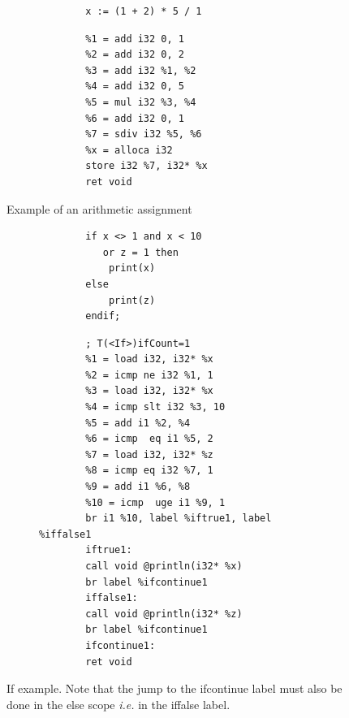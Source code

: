 \documentclass[letterpaper]{article}
\begin{document}
\begin{figure}[H]
    \begin{subfigure}{.5\textwidth}
        \begin{lstlisting}
        x := (1 + 2) * 5 / 1
        \end{lstlisting}
    \end{subfigure}
    \begin{subfigure}{.5\textwidth}
        \begin{lstlisting}
        %1 = add i32 0, 1
    	%2 = add i32 0, 2
    	%3 = add i32 %1, %2
    	%4 = add i32 0, 5
    	%5 = mul i32 %3, %4
    	%6 = add i32 0, 1
    	%7 = sdiv i32 %5, %6
    	%x = alloca i32
    	store i32 %7, i32* %x
    	ret void
        \end{lstlisting}
    \end{subfigure}
    \caption{Example of an arithmetic assignment}
\end{figure}


\begin{figure}[H]
    \begin{subfigure}{.5\textwidth}
        \begin{lstlisting}
        if x <> 1 and x < 10
           or z = 1 then
            print(x)
        else
            print(z)
        endif;
        \end{lstlisting}
    \end{subfigure}
    \begin{subfigure}{.5\textwidth}
        \begin{lstlisting}
        ; T(<If>)ifCount=1
    	%1 = load i32, i32* %x
    	%2 = icmp ne i32 %1, 1
    	%3 = load i32, i32* %x
    	%4 = icmp slt i32 %3, 10
    	%5 = add i1 %2, %4
    	%6 = icmp  eq i1 %5, 2
    	%7 = load i32, i32* %z
    	%8 = icmp eq i32 %7, 1
    	%9 = add i1 %6, %8
    	%10 = icmp  uge i1 %9, 1
    	br i1 %10, label %iftrue1, label %iffalse1
    	iftrue1:
    	call void @println(i32* %x)
    	br label %ifcontinue1
    	iffalse1:
    	call void @println(i32* %z)
    	br label %ifcontinue1
    	ifcontinue1:
    	ret void
        \end{lstlisting}
    \end{subfigure}
    \caption{If example. Note that the jump to the ifcontinue label must
    also be done in the else scope \textit{i.e.} in the iffalse label.}
\end{figure}
\end{document}
